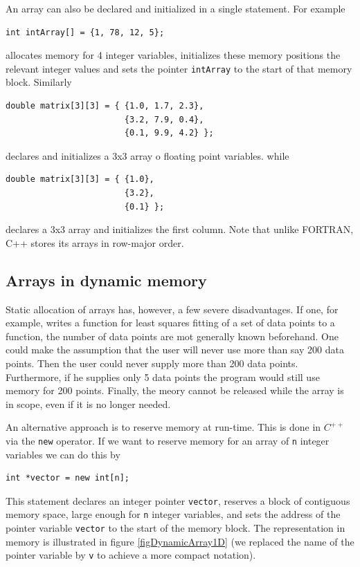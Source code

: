An array can also be declared and initialized in a single statement.
 For example
{\small \begin{verbatim}
int intArray[] = {1, 78, 12, 5};
\end{verbatim}}
\noindent
allocates memory for 4 integer variables, initializes these memory positions the
relevant integer values and sets the pointer \verb+intArray+ to the start of that memory
block. 
Similarly
{\small \begin{verbatim}
double matrix[3][3] = { {1.0, 1.7, 2.3},
                        {3.2, 7.9, 0.4},
                        {0.1, 9.9, 4.2} };
\end{verbatim}}
\noindent
declares and initializes a 3x3 array o floating point variables.
while
{\small \begin{verbatim}
double matrix[3][3] = { {1.0},
                        {3.2},
                        {0.1} };
\end{verbatim}}
\noindent
declares a 3x3 array and initializes the first column. Note that unlike FORTRAN,
C++ stores its arrays in row-major order.


\subsection{Arrays in dynamic memory}

Static allocation of arrays has, however, a few severe disadvantages. If one, for example,
writes a function for least squares fitting of a set of data points to a function, the
number of data points are mot generally known beforehand. One could make the assumption
that the user will never use more than say 200 data points. Then the user could never
supply more than 200 data points. Furthermore, if he supplies only 5 data points the program
would still use memory for 200 points. Finally, the meory cannot be released while the
array is in scope, even if it is no longer needed.

An alternative approach is to reserve memory at run-time. This is done in $C^{++}$ via
the \verb+new+ operator. If we want to reserve memory for an array of \verb+n+ integer
variables we can do this by
{\small \begin{verbatim}
int *vector = new int[n];
\end{verbatim}}
\noindent
This statement declares an integer pointer \verb+vector+, reserves a block of
contiguous memory space, large enough for \verb+n+ integer variables, and sets
the address of the pointer variable \verb+vector+ to the start of the memory block.
The representation in memory is illustrated in figure \ref{figDynamicArray1D} 
(we replaced the
name of the pointer variable by \verb+v+ to achieve a more compact notation).


